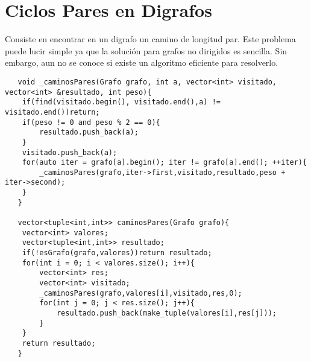 \documentclass[a4paper,12pt]{article}
\begin{document}
  \section{Ciclos Pares en Digrafos}
  Consiste en encontrar en un digrafo un camino de longitud par. Este problema
  puede lucir simple ya que la solución para grafos no dirigidos es sencilla.
  Sin embargo, aun no se conoce si existe un algoritmo eficiente para resolverlo.
  \begin{lstlisting}
   void _caminosPares(Grafo grafo, int a, vector<int> visitado, vector<int> &resultado, int peso){
    if(find(visitado.begin(), visitado.end(),a) != visitado.end())return;
    if(peso != 0 and peso % 2 == 0){
        resultado.push_back(a);
    }
    visitado.push_back(a);
    for(auto iter = grafo[a].begin(); iter != grafo[a].end(); ++iter){
        _caminosPares(grafo,iter->first,visitado,resultado,peso + iter->second);
    }
   }
   
   vector<tuple<int,int>> caminosPares(Grafo grafo){
    vector<int> valores;
    vector<tuple<int,int>> resultado;
    if(!esGrafo(grafo,valores))return resultado;
    for(int i = 0; i < valores.size(); i++){
        vector<int> res;
        vector<int> visitado;
        _caminosPares(grafo,valores[i],visitado,res,0);
        for(int j = 0; j < res.size(); j++){
            resultado.push_back(make_tuple(valores[i],res[j]));
        }
    }
    return resultado;
   }
  \end{lstlisting}
\end{document}

